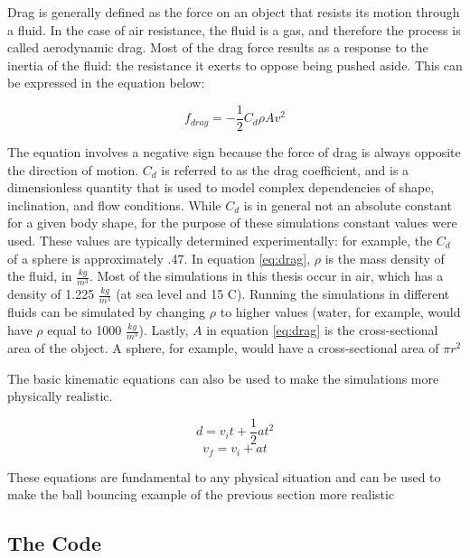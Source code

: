 Drag is generally defined as the force on an object that resists its motion through a fluid.  In the case of air resistance, the fluid is a gas, and therefore the process is called aerodynamic drag.  Most of the drag force results as a response to the inertia of the fluid: the resistance it exerts to oppose being pushed aside.  This can be expressed in the equation below:

\begin{equation} \label{eq:drag}
f_{drag} = -\frac{1}{2}C_d \rho A v^2
\end{equation}

The equation involves a negative sign because the force of drag is always opposite the direction of motion.  $C_d$ is referred to as the drag coefficient, and is a dimensionless quantity that is used to model complex dependencies of shape, inclination, and flow conditions.  While $C_d$ is in general not an absolute constant for a given body shape, for the purpose of these simulations constant values were used.  These values are typically determined experimentally: for example, the $C_d$ of a sphere is approximately .47.  In equation \ref{eq:drag}, $\rho$ is the mass density of the fluid, in $\frac{kg}{m^3}$.  Most of the simulations in this thesis occur in air, which has a density of 1.225 $\frac{kg}{m^3}$  (at sea level and 15 \textdegree C).  Running the simulations in different fluids can be simulated by changing $\rho$ to higher values (water, for example, would have $\rho$ equal to 1000 $\frac{kg}{m^3}$).  Lastly, $A$ in equation \ref{eq:drag} is the cross-sectional area of the object.  A sphere, for example, would have a cross-sectional area of $\pi r^2 $ 

The basic kinematic equations can also be used to make the simulations more physically realistic.  

\begin{equation}\label{eq:position}
d = v_i t+ \frac{1}{2}at^2
\end{equation}
\begin{equation}\label{eq:v}
v_f = v_i + at
\end{equation}

These equations are fundamental to any physical situation and can be used to make the ball bouncing example of the previous section more realistic

\subsection{The Code}

